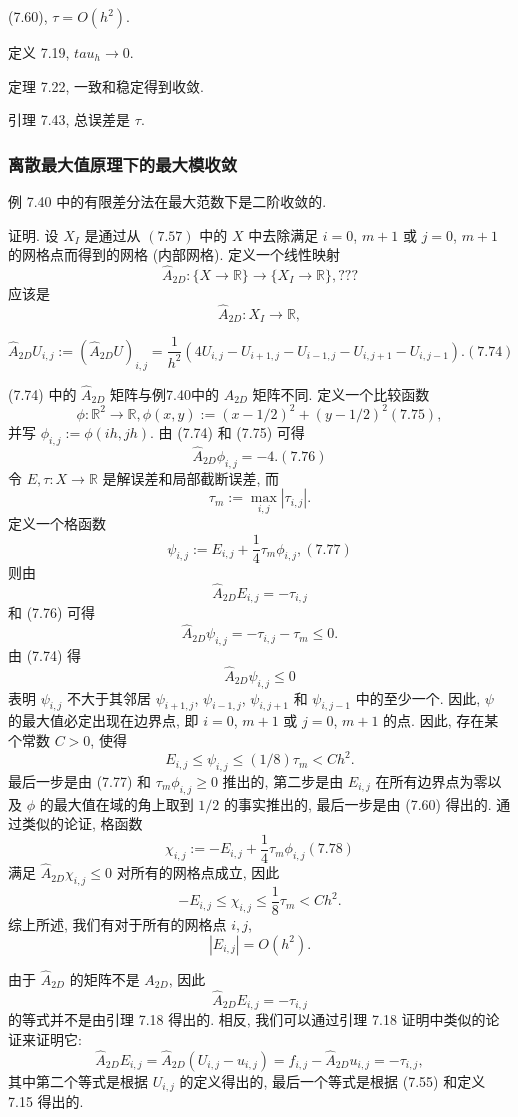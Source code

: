 \documentclass[a4paper]{ctexart}
\newcommand{\hl}[1]
{\noindent {\bf {#1}}}
\begin{document}
{(7.60), $\tau = O(h^2)$.

定义 7.19, $tau_h \to 0$.

定理 7.22, 一致和稳定得到收敛.

引理 7.43, 总误差是 $\tau$.

\subsubsection{离散最大值原理下的最大模收敛}

\hl{定理7.55} 例 7.40 中的有限差分法在最大范数下是二阶收敛的.

证明. 设 $X_I$ 是通过从 $(7.57)$ 中的 $X$ 中去除满足 $i = 0$, $m+1$ 
或 $j = 0$, $m+1$ 的网格点而得到的网格 (内部网格). 
定义一个线性映射 
$$
\hat{A}_{2D} : \{X \rightarrow \mathbb{R}\} 
\rightarrow \{X_I \rightarrow \mathbb{R}\},  ???
$$
应该是
$$
\hat{A}_{2D} : X_I \rightarrow \mathbb{R},  
$$

$$
\hat{A}_{2D} U_{i,j} := (\hat{A}_{2D} U)_{i,j} 
= \frac{1}{h^2} (4U_{i,j} - U_{i+1,j} - U_{i-1,j} - U_{i,j+1} - U_{i,j-1}).
(7.74)
$$

(7.74) 中的 $\hat{A}_{2D}$ 矩阵与例7.40中的 $A_{2D}$ 矩阵不同.
定义一个比较函数
$$
\phi : \mathbb{R}^2 \rightarrow \mathbb{R}, 
\phi(x, y) := (x - 1/2)^2 + (y - 1/2)^2 (7.75),
$$
并写 
$\phi_{i,j} := \phi(ih, jh)$. 
由 (7.74) 和 (7.75) 可得 
$$
\hat{A}_{2D}\phi_{i,j} = -4. (7.76)
$$
令 $E, \tau : X \rightarrow \mathbb{R}$ 是解误差和局部截断误差, 
而 
$$
\tau_m := \max_{i, j} |\tau_{i, j}|. 
$$
定义一个格函数
$$
\psi_{i,j} := E_{i,j} + \frac14 \tau_m \phi_{i,j}, (7.77)
$$ 
则由
$$
\hat{A}_{2D} E_{i,j} = -\tau_{i,j} 
$$
和 (7.76) 可得
$$
\hat{A}_{2D} \psi_{i,j} = -\tau_{i,j} - \tau_m \leq 0.
$$
由 (7.74) 得 
$$
\hat{A}_{2D} \psi_{i,j} \leq 0
$$
表明 $\psi_{i,j}$ 不大于其邻居 $\psi_{i+1,j}$, 
$\psi_{i-1,j}$, $\psi_{i,j+1}$ 和 $\psi_{i,j-1}$ 
中的至少一个. 因此, $\psi$ 的最大值必定出现在边界点, 
即 $i = 0$, $m + 1$ 或 $j = 0$, $m + 1$ 的点. 
因此, 存在某个常数 $C > 0$, 
使得 
$$
E_{i,j} \leq \psi_{i,j} \leq (1/8) \tau_m < C h^2.
$$
最后一步是由 (7.77) 和 $\tau_m \phi_{i,j} \geq 0$ 推出的, 
第二步是由 $E_{i,j}$ 在所有边界点为零以及 $\phi$ 的最大值在域的角上取到 $1/2$ 
的事实推出的, 最后一步是由 (7.60) 得出的. 
通过类似的论证, 格函数
$$
\chi_{i,j} := -E_{i,j} + \frac14 \tau_m \phi_{i,j} (7.78)
$$
满足 $\hat{A}_{2D} \chi_{i,j} \leq 0$ 
对所有的网格点成立, 因此
$$
-E_{i,j} \leq \chi_{i,j} \leq \frac18 \tau_m < Ch^2.
$$
综上所述, 我们有对于所有的网格点 $i,j$, 
$$
|E_{i,j}| = O(h^2).
$$

由于 $\hat{A}_{2D}$ 的矩阵不是 $A_{2D}$, 
因此 
$$
\hat{A}_{2D} E_{i,j} = -\tau_{i,j}
$$
的等式并不是由引理 7.18 得出的. 相反, 我们可以通过引理 7.18 证明中类似的论证来证明它: 
$$
\hat{A}_{2D} E_{i,j} = \hat{A}_{2D}(U_{i,j} - u_{i,j}) 
= f_{i,j} - \hat{A}_{2D} u_{i,j} = -\tau_{i,j}, 
$$
其中第二个等式是根据 $U_{i,j}$ 的定义得出的, 最后一个等式是根据 (7.55) 和定义 7.15 得出的.

}
\end{document}
